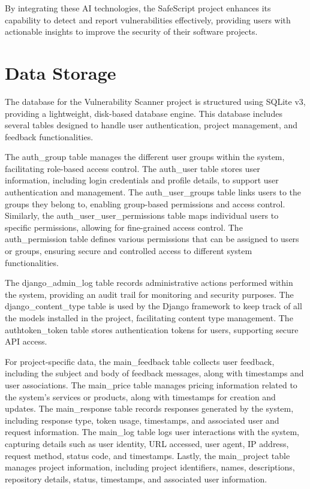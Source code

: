By integrating these AI technologies, the SafeScript project enhances its capability to detect and report vulnerabilities effectively, 
providing users with actionable insights to improve the security of their software projects.

\section{Data Storage} 

The database for the Vulnerability Scanner project is structured using SQLite v3, providing a lightweight, disk-based database engine. 
This database includes several tables designed to handle user authentication, project management, and feedback functionalities.

The auth\_group table manages the different user groups within the system, facilitating role-based access control. 
The auth\_user table stores user information, including login credentials and profile details, to support user authentication and management. 
The auth\_user\_groups table links users to the groups they belong to, enabling group-based permissions and access control. 
Similarly, the auth\_user\_user\_permissions table maps individual users to specific permissions, allowing for fine-grained access control. 
The auth\_permission table defines various permissions that can be assigned to users or groups, ensuring secure and controlled access 
to different system functionalities.

The django\_admin\_log table records administrative actions performed within the system, providing an audit trail for monitoring and security purposes. 
The django\_content\_type table is used by the Django framework to keep track of all the models installed in the project, 
facilitating content type management. 
The authtoken\_token table stores authentication tokens for users, supporting secure API access.

For project-specific data, the main\_feedback table collects user feedback, including the subject and body of 
feedback messages, along with timestamps and user associations. 
The main\_price table manages pricing information related to the system's services or products, along with 
timestamps for creation and updates. The main\_response table records responses generated by the system, 
including response type, token usage, timestamps, and associated user and request information. 
The main\_log table logs user interactions with the system, capturing details such as user identity, 
URL accessed, user agent, IP address, request method, status code, and timestamps. Lastly, the main\_project 
table manages project information, including project identifiers, names, descriptions, repository details, status, 
timestamps, and associated user information.

